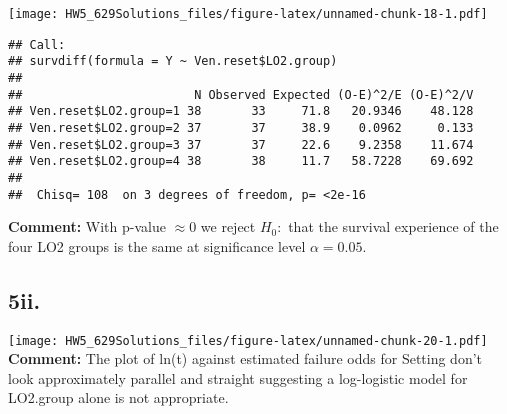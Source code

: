 \documentclass[]{article}
\newenvironment{Shaded}{\begin{snugshade}}{\end{snugshade}}
\newcommand{\CommentTok}[1]{\textcolor[rgb]{0.56,0.35,0.01}{\textit{#1}}}
\newcommand{\DataTypeTok}[1]{\textcolor[rgb]{0.13,0.29,0.53}{#1}}
\newcommand{\DecValTok}[1]{\textcolor[rgb]{0.00,0.00,0.81}{#1}}
\newcommand{\KeywordTok}[1]{\textcolor[rgb]{0.13,0.29,0.53}{\textbf{#1}}}
\newcommand{\NormalTok}[1]{#1}
\newcommand{\OperatorTok}[1]{\textcolor[rgb]{0.81,0.36,0.00}{\textbf{#1}}}
\newcommand{\StringTok}[1]{\textcolor[rgb]{0.31,0.60,0.02}{#1}}
\begin{document}
\texttt{[image: HW5\_629Solutions\_files/figure-latex/unnamed-chunk-18-1.pdf]}

\begin{Shaded}
\end{Shaded}

\begin{verbatim}
## Call:
## survdiff(formula = Y ~ Ven.reset$LO2.group)
## 
##                        N Observed Expected (O-E)^2/E (O-E)^2/V
## Ven.reset$LO2.group=1 38       33     71.8   20.9346    48.128
## Ven.reset$LO2.group=2 37       37     38.9    0.0962     0.133
## Ven.reset$LO2.group=3 37       37     22.6    9.2358    11.674
## Ven.reset$LO2.group=4 38       38     11.7   58.7228    69.692
## 
##  Chisq= 108  on 3 degrees of freedom, p= <2e-16
\end{verbatim}

\textbf{Comment:} With p-value \(\approx0\) we reject \(H_0:\) that the
survival experience of the four LO2 groups is the same at significance
level \(\alpha=0.05\).

\hypertarget{ii.-3}{%
\subsection{5ii.}\label{ii.-3}}

\begin{Shaded}
\end{Shaded}

\texttt{[image: HW5\_629Solutions\_files/figure-latex/unnamed-chunk-20-1.pdf]}
\textbf{Comment:} The plot of ln(t) against estimated failure odds for
Setting don't look approximately parallel and straight suggesting a
log-logistic model for LO2.group alone is not appropriate.
\end{document}
